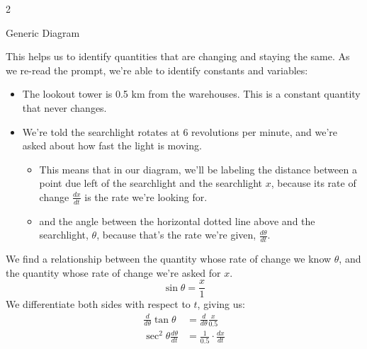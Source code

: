 \documentclass{article}
\begin{document}
\begin{enumerate}
\begin{solution}
\begin{multicols}{2}
\begin{tikzpicture}
    \end{tikzpicture}

Generic Diagram\\
    \end{multicols}
    This helps us to identify quantities that are changing and staying the same. As we re-read the prompt, we're able to identify constants and variables:
    \begin{itemize}
    \item The lookout tower is 0.5 km from the warehouses. This is a constant quantity that never changes.
    \item We're told the searchlight rotates at 6 revolutions per minute, and we're asked about how fast the light is moving. 
    \begin{itemize}
        \item This means that in our diagram, we'll be labeling the distance between a point due left of the searchlight and the searchlight $x$, because its rate of change $\frac{dx}{dt}$ is the rate we're looking for.
        \item and the angle between the horizontal dotted line above and the searchlight, $\theta$, because that's the rate we're given, $\frac{d\theta}{dt}$.
    \end{itemize}
    \end{itemize}
    We find a relationship between the quantity whose rate of change we know $\theta$, and the quantity whose rate of change we're asked for $x$.
    $$\sin \theta = \frac{x}{1}$$
    We differentiate both sides with respect to $t$, giving us:
    \begin{align*}
        \frac{d}{d\theta}\tan \theta &= \frac{d}{d\theta}\frac{x}{0.5}\\
        \sec^2\theta \frac{d\theta}{dt}&= \frac{1}{0.5}\cdot \frac{dx}{dt}\\

\end{align*}
\end{solution}
\end{enumerate}
\end{document}
